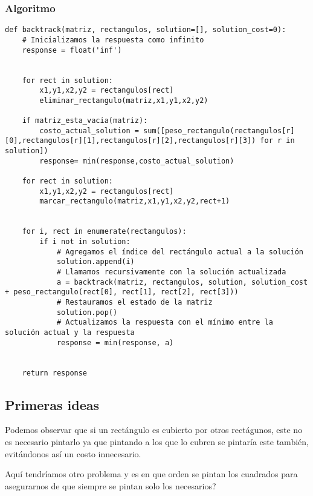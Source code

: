 \documentclass{article}
\begin{document}
	\subsubsection{Algoritmo}
	\begin{lstlisting}
def backtrack(matriz, rectangulos, solution=[], solution_cost=0):
    # Inicializamos la respuesta como infinito
    response = float('inf')


    for rect in solution:
        x1,y1,x2,y2 = rectangulos[rect]
        eliminar_rectangulo(matriz,x1,y1,x2,y2)

    if matriz_esta_vacia(matriz):
        costo_actual_solution = sum([peso_rectangulo(rectangulos[r][0],rectangulos[r][1],rectangulos[r][2],rectangulos[r][3]) for r in solution])
        response= min(response,costo_actual_solution)

    for rect in solution:
        x1,y1,x2,y2 = rectangulos[rect]
        marcar_rectangulo(matriz,x1,y1,x2,y2,rect+1)

    
    for i, rect in enumerate(rectangulos):
        if i not in solution:
            # Agregamos el índice del rectángulo actual a la solución
            solution.append(i)
            # Llamamos recursivamente con la solución actualizada
            a = backtrack(matriz, rectangulos, solution, solution_cost + peso_rectangulo(rect[0], rect[1], rect[2], rect[3]))
            # Restauramos el estado de la matriz
            solution.pop()
            # Actualizamos la respuesta con el mínimo entre la solución actual y la respuesta
            response = min(response, a)

    
    return response

	\end{lstlisting}
	
	\subsection{Primeras ideas}
	Podemos observar que si un rectángulo es cubierto por otros rectágunos, este no es necesario pintarlo ya que pintando a los que lo cubren se pintaría este también, evitándonos así un costo innecesario.

Aquí tendríamos otro problema y es en que orden se pintan los cuadrados para asegurarnos de que siempre se pintan solo los necesarios?
\end{document}
